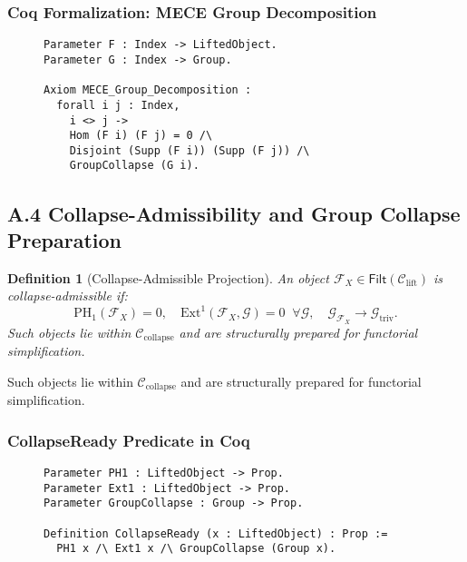 \documentclass[11pt]{article}
\newtheorem{definition}[theorem]{Definition}
\begin{document}
\subsubsection*{Coq Formalization: MECE Group Decomposition}

\begin{figure}[h]
\centering
\begin{lstlisting}[language=Coq, caption=Group-Compatible MECE Decomposition]
Parameter F : Index -> LiftedObject.
Parameter G : Index -> Group.

Axiom MECE_Group_Decomposition :
  forall i j : Index,
    i <> j ->
    Hom (F i) (F j) = 0 /\
    Disjoint (Supp (F i)) (Supp (F j)) /\
    GroupCollapse (G i).
\end{lstlisting}
\end{figure}


\subsection*{A.4 Collapse-Admissibility and Group Collapse Preparation}

\begin{definition}[Collapse-Admissible Projection]
An object \( \mathcal{F}_X \in \mathsf{Filt}(\mathcal{C}_{\mathrm{lift}}) \) is \emph{collapse-admissible} if:
\[
\mathrm{PH}_1(\mathcal{F}_X) = 0, \quad \mathrm{Ext}^1(\mathcal{F}_X, \mathcal{G}) = 0 \;\; \forall \mathcal{G}, \quad \mathcal{G}_{\mathcal{F}_X} \longrightarrow \mathcal{G}_{\mathrm{triv}}.
\]
Such objects lie within \( \mathcal{C}_{\mathrm{collapse}} \) and are structurally prepared for functorial simplification.
\end{definition}


Such objects lie within \( \mathcal{C}_{\mathrm{collapse}} \) and are structurally prepared for functorial simplification.

\subsubsection*{CollapseReady Predicate in Coq}

\begin{figure}[h]
\centering
\begin{lstlisting}[language=Coq, caption=Collapse-Readiness Predicate]
Parameter PH1 : LiftedObject -> Prop.
Parameter Ext1 : LiftedObject -> Prop.
Parameter GroupCollapse : Group -> Prop.

Definition CollapseReady (x : LiftedObject) : Prop :=
  PH1 x /\ Ext1 x /\ GroupCollapse (Group x).
\end{lstlisting}
\end{figure}
\end{document}
